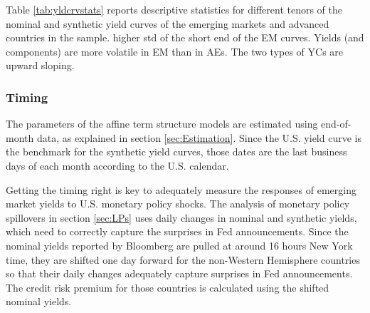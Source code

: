 {Table \ref{tab:yldcrvstats} reports descriptive statistics for different tenors of the nominal and synthetic yield curves of the emerging markets and advanced countries in the sample. 
higher std of the short end of the EM curves. 
Yields (and components) are more volatile in EM than in AEs.
The two types of YCs are upward sloping.



\subsubsection{Timing}
The parameters of the affine term structure models are estimated using end-of-month data, as explained in section \ref{sec:Estimation}.
Since the U.S. yield curve is the benchmark for the synthetic yield curves, those dates are the last business days of each month according to the U.S. calendar.

Getting the timing right is key to adequately measure the responses of emerging market yields to U.S. monetary policy shocks.
The analysis of monetary policy spillovers in section \ref{sec:LPs} uses daily changes in nominal and synthetic yields, which need to correctly capture the surprises in Fed announcements.
Since the nominal yields reported by Bloomberg are pulled at around 16 hours New York time, they are shifted one day forward for the non-Western Hemisphere countries so that their daily changes adequately capture surprises in Fed announcements.
The credit risk premium for those countries is calculated using the shifted nominal yields.



}{}	%


